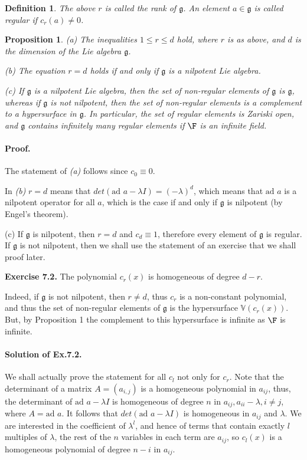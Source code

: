 \documentclass[11pt]{article}
\newcommand{\ad}{\mbox{ad\ }}
\newcommand{\g}{\mathfrak{g}}
\newcommand{\sk}{\vspace*{1em}}
\newtheorem{defn}{Definition}
\newtheorem{prop}{Proposition}
\begin{document}
\begin{defn} The above $r$ is called the \emph{rank} of $\g$. An element $a \in \g$ is called regular if $c_r(a)\neq 0$. 
\end{defn}

\begin{prop}
(a) The inequalities $1\leq r\leq d$ hold, where $r$ is as  above, and $d$ is the dimension of the Lie algebra $\g$.

(b) The equation $r=d$ holds  if and only if $\g$ is a nilpotent Lie algebra. 

(c) If $\g$ is a nilpotent Lie algebra, then  the set of non-regular elements of  $\g$ is $\g$, whereas if  $\g$ is not nilpotent, then the set of non-regular elements  is a complement to a hypersurface in $\g$. In particular, the set of regular elements is Zariski open, and  $\g$ contains infinitely many regular elements if $\F$ is an infinite field. 

\end{prop}


\paragraph{Proof.} The statement of \textit{(a)} follows since $c_0\equiv 0$. 


In \textit{(b)} $r=d$ means that $det(\ad a-\lambda I)=(-\lambda)^d$, which means that $\ad a$ is a nilpotent operator for all $a$, which is the case if and only if $\g$ is nilpotent (by Engel's theorem). 

(c) If $\g$ is nilpotent, then $r=d$ and $c_d\equiv 1$, therefore every element of $\g$ is regular. If $\g$ is not nilpotent, then we shall use the statement of an exercise that we shall proof later. 


\sk\noindent
{\bf Exercise 7.2.} The polynomial $c_r(x)$ is homogeneous of degree $d-r$. 

Indeed, if $\g$ is not nilpotent, then $r\neq d$, thus $c_r$ is a non-constant polynomial, and thus the set of non-regular elements of $\g$ is the hypersurface $\mathbb{V}(c_r(x))$. But, by Proposition 1 the complement to this hypersurface is infinite as $\F$ is infinite. 


\paragraph{Solution of Ex.7.2.}
We shall actually prove the statement for all $c_l$ not only for $c_r$. 
Note that the determinant of a matrix $A=(a_{i, j})$ is a homogeneous polynomial in $a_{ij}$, thus,  the determinant of $\ad a-\lambda I$ is homogeneous of degree $n$ in $a_{ij},a_{ii}-\lambda,i\ne j$, where $A=\ad a$. It follows that 
 $det (\ad a - \lambda I)$ is  homogeneous
in $a_{ij}$ and $\lambda$. We are interested in the coefficient
of $\lambda^{l}$, and hence of terms that contain exactly $l$ multiples
of $\lambda$, the rest of the $n$ variables in each term are $a_{ij}$,
so $c_{l}(x)$ is a homogeneous polynomial of degree $n-i$ in $a_{ij}$.
\end{document}
